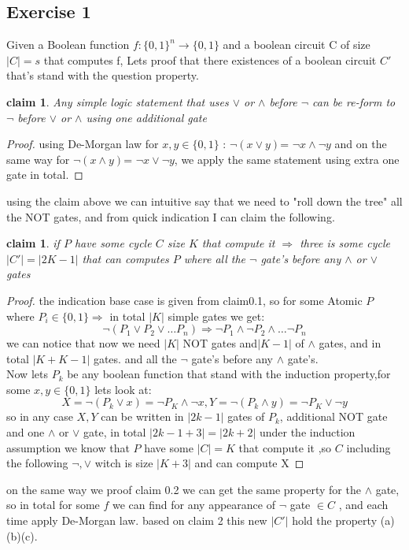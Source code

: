\documentclass[12pt]{article}
\newtheorem{claim}[theorem]{claim}
\begin{document}
\subsection{Exercise 1}
Given a Boolean function $f : \lbrace0, 1\rbrace
^n \rightarrow \lbrace0, 1\rbrace$ and a boolean circuit C of size
$|C| = s$ that computes f, Lets proof that there existences of a boolean circuit $C'$ that's stand with the question property.
\begin{claim}
Any simple logic statement that uses $\vee$ or $ \wedge$ before $ \neg$ can be re-form to $\neg$ before $\vee$ or $ \wedge$ using one additional gate
\end{claim}
\begin{proof}
using De-Morgan law for  $ x,y \in \lbrace0, 1\rbrace$ : $\neg(x \vee y)$= $ \neg x \wedge \neg y$ and on the same way for $\neg(x \wedge y)$= $ \neg x \vee \neg y$, we apply the same statement using extra one gate in total. 
\end{proof}
using the claim above we can intuitive say that we need to "roll down the tree" all the NOT gates, and from quick indication I  can claim the following.
\begin{claim}
if $P$ have some cycle $C$ size $K$ that compute it $\Rightarrow$ three is some cycle $|C'|= |2K-1|$ that can computes $P$ where all the  $\neg$ gate's before any $ \wedge$ or $\vee$ gates
\end{claim}
\begin{proof}
the indication base case is given from claim0.1, so for some Atomic  $P$ where $P_i \in \lbrace0, 1\rbrace \Rightarrow$ in total $|K|$ simple gates we get:
\[  \neg (P_1 \vee P_2 \vee \dots P_n)\Rightarrow \neg P_1 \wedge \neg P_2 \wedge \dots \neg P_n  
\]
we can notice that now we need $|K|$ NOT gates and$|K-1|$ of $\wedge$ gates, and in total $|K+K-1|$  gates.
and all the  $\neg$ gate's before any $ \wedge$ gate's. \\Now lets $P_k$ be any boolean function that stand with the induction property,for some $x,y \in \lbrace0, 1\rbrace$ lets look at: 
\[ X=\neg (P_k\vee x)= \neg P_K \wedge \neg x, Y=\neg (P_k\wedge  y)= \neg P_K \vee \neg y\]
so in any case $X,Y$ can be written in $|2k-1|$ gates of $P_k$, additional NOT gate and one $\wedge$ or $\vee$ gate, in total $|2k-1+3|=|2k+2|$ under the induction assumption we know that $P$ have some $|C|=K$ that compute it ,so $C$ including the following $
\neg , \vee$ witch is size $|K+3|$ and can compute X
\end{proof}
on the same way we proof claim 0.2 we can get the same  property for  the $\wedge$ gate, so in total for some $f$ we can find for any appearance  of $\neg$ gate  $\in C$ , and each time apply De-Morgan law. based on claim 2 this new $|C'|$ hold the property (a)(b)(c).
\end{document}
